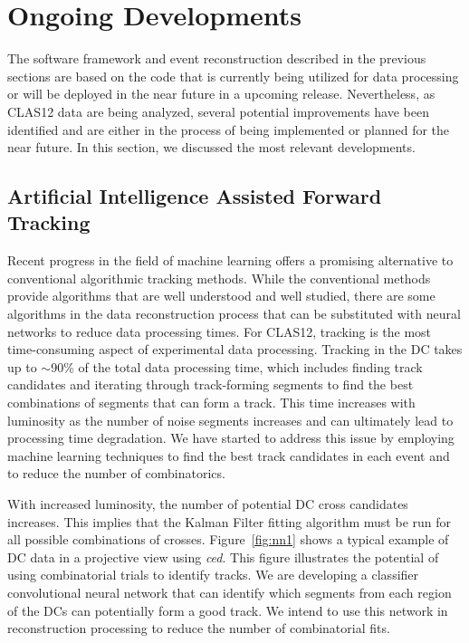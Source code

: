 \section{Ongoing Developments}

The software framework and event reconstruction described in the previous sections are based on the code that
is currently being utilized for data processing or will be deployed in the near future in a upcoming release.
Nevertheless, as CLAS12 data are being analyzed, several potential improvements have been identified and are
either in the process of being implemented or planned for the near future. In this section, we discussed the most
relevant developments.

\subsection{Artificial Intelligence Assisted Forward Tracking}

Recent progress in the field of machine learning offers a promising alternative to conventional algorithmic tracking
methods. While the conventional methods provide algorithms that are well understood and well studied, there are
some algorithms in the data reconstruction process that can be substituted with neural networks to reduce data
processing times. For CLAS12, tracking is the most time-consuming aspect of experimental data processing.
Tracking in the DC takes up to $\sim$90\% of the total data processing time, which includes finding track
candidates and iterating through track-forming segments to find the best combinations of segments that can form
a track. This time increases with luminosity as the number of noise segments increases and can ultimately lead to
processing time degradation. We have started to address this issue by employing machine learning techniques
to find the best track candidates in each event and to reduce the number of combinatorics.

With increased luminosity, the number of potential DC cross candidates increases. This implies that the Kalman
Filter fitting algorithm must be run for all possible combinations of crosses. Figure~\ref{fig:nn1} shows a typical
example of DC data in a projective view using {\it ced}. This figure illustrates the potential of using combinatorial
trials to identify tracks. We are developing a classifier convolutional neural network that can identify which
segments from each region of the DCs can potentially form a good track. We intend to use this network in
reconstruction processing to reduce the number of combinatorial fits.

